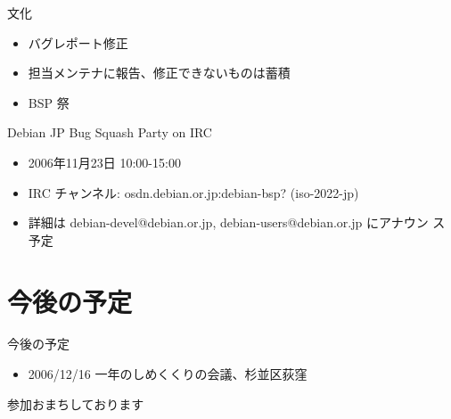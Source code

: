 \documentclass[cjk,dvipdfmx]{beamer}
\begin{document}
\begin{frame}{文化}
\begin{itemize}
 \item バグレポート修正
 \item 担当メンテナに報告、修正できないものは蓄積
 \item BSP 祭
\end{itemize}
\end{frame}

\begin{frame}{Debian JP Bug Squash Party on IRC}
 \begin{minipage}[t]{0.5\hsize}
  \begin{itemize}
   \item 2006年11月23日 10:00-15:00
   \item IRC チャンネル: osdn.debian.or.jp:debian-bsp? (iso-2022-jp) 
   \item 詳細は debian-devel@debian.or.jp, debian-users@debian.or.jp にアナウン
	 ス予定
  \end{itemize}
 \end{minipage}
 \begin{minipage}[t]{0.4\hsize}
 \end{minipage}
\end{frame}

\section{今後の予定}
\begin{frame}{今後の予定}
\begin{itemize}
 \item 2006/12/16 一年のしめくくりの会議、杉並区荻窪
\end{itemize}

 参加おまちしております
\end{frame}
\end{document}
